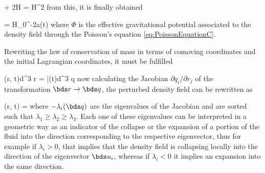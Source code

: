 {  + 2H =
 H^2 \bds \Psi  }
from this, it is finally obtained


{ \bds \Psi = H_0^{-2}a(t)\nabla \Phi  }
where $\Phi$ is the effective gravitational potential associated to the
density field through the Poisson's equation \ref{eq:PoissonEquationC}.


Rewriting the law of conservation of mass in terms of comoving coordinates
and the initial Lagrangian coordinates, it must be fulfilled


{ \rho(\bds r, t)d^3 \bds r = \bar{\rho}(t)d^3 \bds q  }
now calculating the Jacobian $\partial q_i / \partial r_j$ of the 
transformation $\bds r \rightarrow \bds q$, the perturbed density field
can be rewritten as \cite{padmanabhan1995}


{ \rho(\bds r, t) =  }
where $-\lambda_i(\bds q)$ are the eigenvalues of the Jacobian and are 
sorted such that $\lambda_1\geq\lambda_2\geq\lambda_3$. Each one of these
eigenvalues can be interpreted in a geometric way as an indicator of the
collapse or the expansion of a portion of the fluid into the direction
corresponding to the respective eigenvector, thus for example if $\lambda_i 
> 0$, that implies that the density field is collapsing locally into the
direction of the eigenvector $\bds u_i$, whereas if $\lambda_i < 0$ it 
implies an expansion into the same direction.


